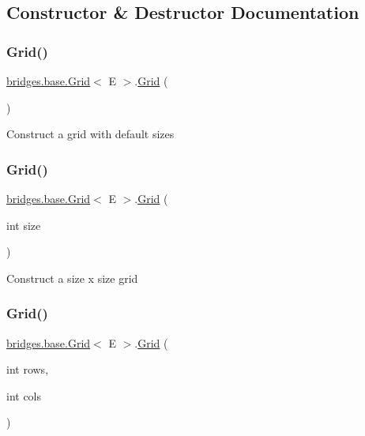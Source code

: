 \subsection{Constructor \& Destructor Documentation}
\mbox{\label{classbridges_1_1base_1_1_grid_aa621ffc958db8341f7ce37ed78944d51}} 
\subsubsection{\texorpdfstring{Grid()}{Grid()}\hspace{0.1cm}{\footnotesize\ttfamily [1/4]}}
{\footnotesize\ttfamily \mbox{\hyperlink{classbridges_1_1base_1_1_grid}{bridges.\+base.\+Grid}}$<$ E $>$.\mbox{\hyperlink{classbridges_1_1base_1_1_grid}{Grid}} (\begin{DoxyParamCaption}{ }\end{DoxyParamCaption})}

Construct a grid with default sizes \mbox{\label{classbridges_1_1base_1_1_grid_a9818d4959813f1292c6a234bc6f6aa9e}} 
\subsubsection{\texorpdfstring{Grid()}{Grid()}\hspace{0.1cm}{\footnotesize\ttfamily [2/4]}}
{\footnotesize\ttfamily \mbox{\hyperlink{classbridges_1_1base_1_1_grid}{bridges.\+base.\+Grid}}$<$ E $>$.\mbox{\hyperlink{classbridges_1_1base_1_1_grid}{Grid}} (\begin{DoxyParamCaption}\item[{int}]{size }\end{DoxyParamCaption})}

Construct a size x size grid \mbox{\label{classbridges_1_1base_1_1_grid_a43a699bd7ae2c6c986f978c515ff97d8}} 
\subsubsection{\texorpdfstring{Grid()}{Grid()}\hspace{0.1cm}{\footnotesize\ttfamily [3/4]}}
{\footnotesize\ttfamily \mbox{\hyperlink{classbridges_1_1base_1_1_grid}{bridges.\+base.\+Grid}}$<$ E $>$.\mbox{\hyperlink{classbridges_1_1base_1_1_grid}{Grid}} (\begin{DoxyParamCaption}\item[{int}]{rows,  }\item[{int}]{cols }\end{DoxyParamCaption})}

